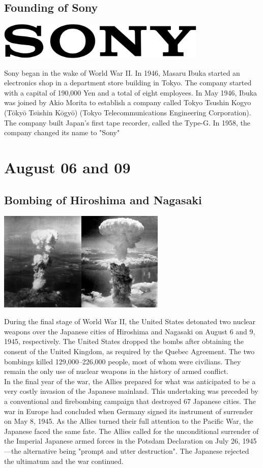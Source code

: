 \documentclass[11pt]{report}
\begin{document}
\subsection{Founding of Sony}
\vspace{2mm}\begin{center}\includegraphics[width=10cm]{./img/sonylogo.jpg}\end{center}
Sony began in the wake of World War II. In 1946, Masaru Ibuka started an electronics shop in a department store building in Tokyo. The company started with a capital of 190,000 Yen and a total of eight employees. In May 1946, Ibuka was joined by Akio Morita to establish a company called Tokyo Tsushin Kogyo (Tōkyō Tsūshin Kōgyō) (Tokyo Telecommunications Engineering Corporation). The company built Japan's first tape recorder, called the Type-G. In 1958, the company changed its name to "Sony"
\section{August 06 and 09}
\subsection{Bombing of Hiroshima and Nagasaki}
\vspace{2mm}\begin{center}\includegraphics[width=8cm]{./img/hiroNagabombing.jpg}\end{center}
During the final stage of World War II, the United States detonated two nuclear weapons over the Japanese cities of Hiroshima and Nagasaki on August 6 and 9, 1945, respectively. The United States dropped the bombs after obtaining the consent of the United Kingdom, as required by the Quebec Agreement. The two bombings killed 129,000–226,000 people, most of whom were civilians. They remain the only use of nuclear weapons in the history of armed conflict.\\
\indent In the final year of the war, the Allies prepared for what was anticipated to be a very costly invasion of the Japanese mainland. This undertaking was preceded by a conventional and firebombing campaign that destroyed 67 Japanese cities. The war in Europe had concluded when Germany signed its instrument of surrender on May 8, 1945. As the Allies turned their full attention to the Pacific War, the Japanese faced the same fate. The Allies called for the unconditional surrender of the Imperial Japanese armed forces in the Potsdam Declaration on July 26, 1945—the alternative being "prompt and utter destruction". The Japanese rejected the ultimatum and the war continued.
\end{document}
